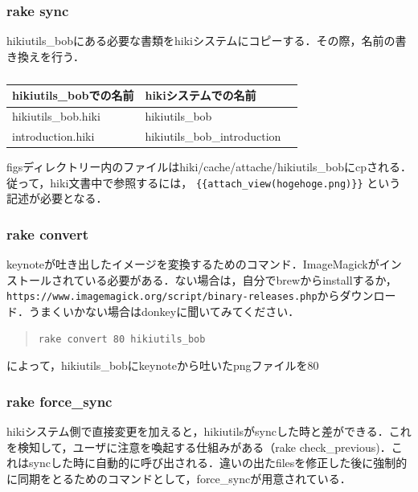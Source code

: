 \subsubsection{rake sync}
hikiutils\_bobにある必要な書類をhikiシステムにコピーする．その際，名前の書き換えを行う．

\begin{table}[htbp]\begin{center}
\caption{}
\begin{tabular}{lll}
\hline
hikiutils\_bobでの名前   &hikiシステムでの名前  \\ \hline
hikiutils\_bob.hiki   &hikiutils\_bob  \\
introduction.hiki   &hikiutils\_bob\_introduction  \\
\hline
\end{tabular}
\label{default}
\end{center}\end{table}

figsディレクトリー内のファイルはhiki/cache/attache/hikiutils\_bobにcpされる．従って，hiki文書中で参照するには，
\verb|{{attach_view(hogehoge.png)}}|
という記述が必要となる．

\subsubsection{rake convert}
keynoteが吐き出したイメージを変換するためのコマンド．ImageMagickがインストールされている必要がある．ない場合は，自分でbrewからinstallするか，\verb|https://www.imagemagick.org/script/binary-releases.php|からダウンロード．うまくいかない場合はdonkeyに聞いてみてください．
\begin{quote}\begin{verbatim}
rake convert 80 hikiutils_bob
\end{verbatim}\end{quote}
によって，hikiutils\_bobにkeynoteから吐いたpngファイルを80%

\subsubsection{rake force\_sync}
hikiシステム側で直接変更を加えると，hikiutilsがsyncした時と差ができる．これを検知して，ユーザに注意を喚起する仕組みがある（rake check\_previous)．これはsyncした時に自動的に呼び出される．違いの出たfilesを修正した後に強制的に同期をとるためのコマンドとして，force\_syncが用意されている．


